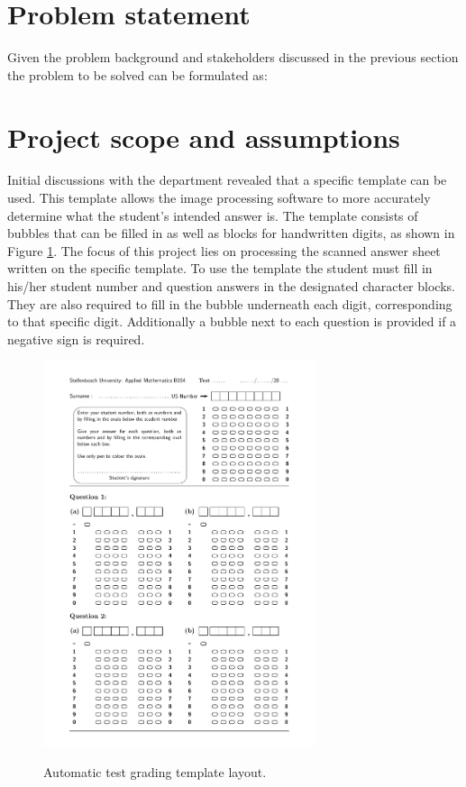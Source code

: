 \section{Problem statement}
\label{sec:problemStatement}

Given the problem background and stakeholders discussed in the previous section the problem to be solved can be formulated as:
\newline
\newline
\noindent{}

\section{Project scope and assumptions}\label{sec:Scope}
Initial discussions with the department revealed that a specific template can be used. This template allows the image processing software to more accurately determine what the student's intended answer is. The template consists of bubbles that can be filled in as well as blocks for handwritten digits, as shown in Figure \ref{fig:NumbersTemplate}. The focus of this project lies on processing the scanned answer sheet written on the specific template. To use the template the student must fill in his/her student number and question answers in the designated character blocks. They are also required to fill in the bubble underneath each digit, corresponding to that specific digit. Additionally a bubble next to each question is provided if a negative sign is required.

\begin{figure}[h]
  \centering
  \includegraphics[width=8cm]{NumbersTemplate}\\
  \caption{Automatic test grading template layout.}
  \label{fig:NumbersTemplate}
\end{figure}


